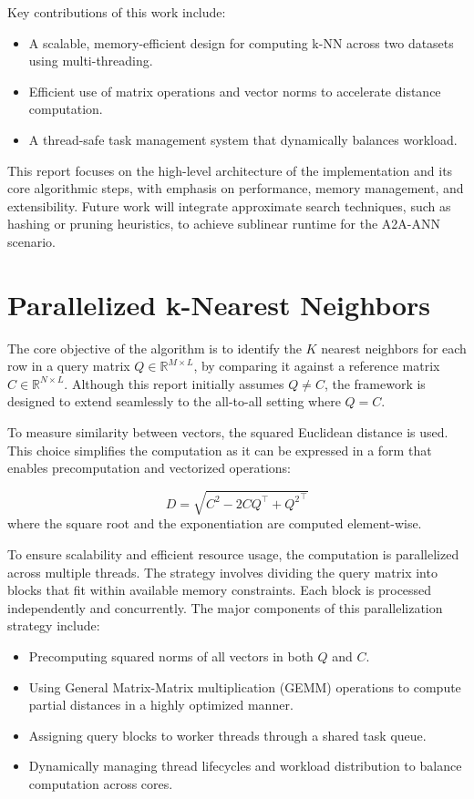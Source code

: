 \documentclass[conference]{IEEEtran}
\begin{document}
Key contributions of this work include:
\begin{itemize}
    \item A scalable, memory-efficient design for computing k-NN across two datasets using multi-threading.
    \item Efficient use of matrix operations and vector norms to accelerate distance computation.
    \item A thread-safe task management system that dynamically balances workload.
\end{itemize}

This report focuses on the high-level architecture of the implementation and its core algorithmic steps, with
emphasis on performance, memory management, and extensibility. Future work will integrate approximate search 
techniques, such as hashing or pruning heuristics, to achieve sublinear runtime for the A2A-ANN scenario.

\section{Parallelized k-Nearest Neighbors}

The core objective of the algorithm is to identify the $K$ nearest neighbors for each row in a query 
matrix $Q \in \mathbb{R}^{M \times L}$, by comparing it against a reference matrix $C \in \mathbb{R}^{N \times L}$.
Although this report initially assumes $Q \neq C$, the framework is designed to extend seamlessly to the all-to-all
setting where $Q = C$.

To measure similarity between vectors, the squared Euclidean distance is used. This choice simplifies the 
computation as it can be expressed in a form that enables precomputation and vectorized operations:

\[
D = \sqrt{C^2 - 2CQ^\top + {Q^2}^{\top}}
\]
where the square root and the exponentiation are computed element-wise.

To ensure scalability and efficient resource usage, the computation is parallelized across multiple threads. 
The strategy involves dividing the query matrix into blocks that fit within available memory constraints. 
Each block is processed independently and concurrently. The major components of this parallelization strategy 
include:

\begin{itemize}
    \item Precomputing squared norms of all vectors in both $Q$ and $C$.
    \item Using General Matrix-Matrix multiplication (GEMM) operations to compute partial distances in a 
    highly optimized manner.
    \item Assigning query blocks to worker threads through a shared task queue.
    \item Dynamically managing thread lifecycles and workload distribution to balance computation across cores.
\end{itemize}
\end{document}
